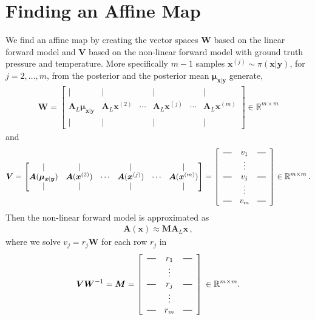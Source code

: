 \section{Finding an Affine Map}
We find an affine map by creating the vector spaces $\bm{W}$ based on the linear forward model and $\bm{V}$ based on the non-linear forward model with ground truth pressure and temperature.
More specifically $m-1$ samples $\bm{x}^{(j)} \sim \pi(\bm{x}|\bm{y})$, for $j = 2, \dots,m$, from the posterior and the posterior mean $\bm{\mu}_{\bm{x}|\bm{y}}$ generate,
\begin{align*}
	\bm{W} = \begin{bmatrix}
		\vert& \vert&   &  \vert & & \vert \\
		\bm{A}_{L}  \bm{\mu}_{\bm{x}|\bm{y}} & \bm{A}_{L}  \bm{x}^{(2)}   &  \cdots& \bm{A}_{L} \bm{x}^{(j)} &  \cdots & \bm{A}_{L} \bm{x}^{(m)} \\
		\vert& \vert&   &  \vert & & \vert 
	\end{bmatrix}
	\in \mathbb{R}^{m \times m}
\end{align*}\noindent and
\begin{align*}
	\bm{V} = \begin{bmatrix}
		\vert& \vert&   &  \vert & & \vert \\
		\bm{A}(\bm{\mu}_{\bm{x}|\bm{y}} ) & \bm{A}(\bm{x}^{(2)}) &  \cdots& \bm{A}(\bm{x}^{(j)}) &  \cdots & \bm{A} (\bm{x}^{(m)})  \\
		\vert&\vert&   &  \vert & & \vert 
	\end{bmatrix} = 
	\begin{bmatrix}
		\begin{array}{ccc}
			\horzbar & v_{1} & \horzbar \\
			& \vdots    &          \\
			\horzbar & v_{j} & \horzbar \\
			& \vdots    &          \\
			\horzbar &v_{m} & \horzbar
		\end{array}
	\end{bmatrix}\in \mathbb{R}^{m \times m} \, .
\end{align*}
Then the non-linear forward model is approximated as 
\begin{align}
	\bm{A}(\bm{x}) \approx \bm{M A}_L \bm{x} \, , \label{eq:AffineM}
\end{align}
where we solve $v_j =r_j \bm{W}$ for each row $r_j$ in
\begin{align*}
	\bm{V}\bm{W}^{-1} = \bm{M} =
	\begin{bmatrix}
		\begin{array}{ccc}
			\horzbar & r_{1} & \horzbar \\
			& \vdots    &          \\
			\horzbar & r_{j} & \horzbar \\
			& \vdots    &          \\
			\horzbar &r_{m} & \horzbar
		\end{array}
	\end{bmatrix}\, \in \mathbb{R}^{m \times m} .
\end{align*}
